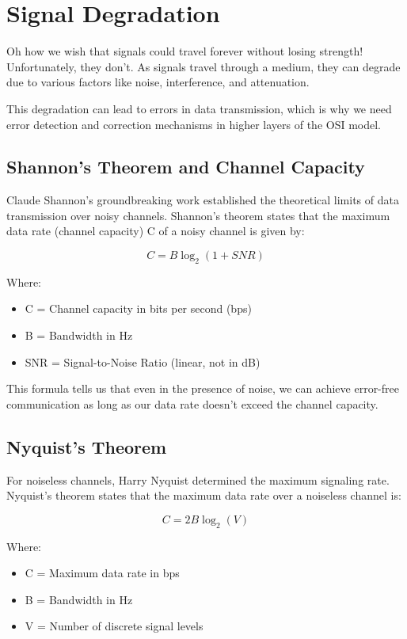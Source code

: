 \section{Signal Degradation}
Oh how we wish that signals could travel forever without losing strength! Unfortunately, they don't. As signals travel through a medium, they can degrade due to various factors like noise, interference, and attenuation.

This degradation can lead to errors in data transmission, which is why we need error detection and correction mechanisms in higher layers of the OSI model.

\subsection*{Shannon's Theorem and Channel Capacity}
Claude Shannon's groundbreaking work established the theoretical limits of data transmission over noisy channels. Shannon's theorem states that the maximum data rate (channel capacity) C of a noisy channel is given by:

\begin{equation}
C = B \log_2(1 + SNR)
\end{equation}

Where:
\begin{itemize}
    \item C = Channel capacity in bits per second (bps)
    \item B = Bandwidth in Hz
    \item SNR = Signal-to-Noise Ratio (linear, not in dB)
\end{itemize}

This formula tells us that even in the presence of noise, we can achieve error-free communication as long as our data rate doesn't exceed the channel capacity.

\subsection*{Nyquist's Theorem}
For noiseless channels, Harry Nyquist determined the maximum signaling rate. Nyquist's theorem states that the maximum data rate over a noiseless channel is:

\begin{equation}
C = 2B \log_2(V)
\end{equation}

Where:
\begin{itemize}
    \item C = Maximum data rate in bps
    \item B = Bandwidth in Hz
    \item V = Number of discrete signal levels
\end{itemize}

